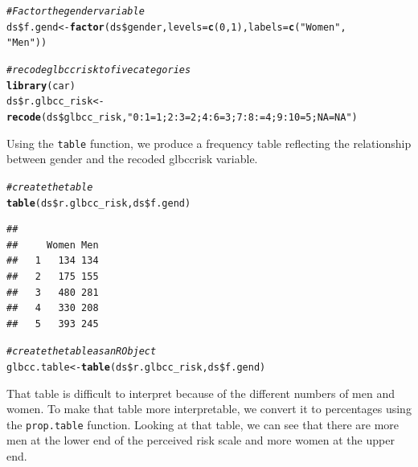 \documentclass[11pt,openany]{book}\usepackage[]{graphicx}\usepackage[]{color}
\makeatletter
\newcommand{\hlnum}[1]{\textcolor[rgb]{0.686,0.059,0.569}{#1}}%
\newcommand{\hlstr}[1]{\textcolor[rgb]{0.192,0.494,0.8}{#1}}%
\newcommand{\hlcom}[1]{\textcolor[rgb]{0.678,0.584,0.686}{\textit{#1}}}%
\newcommand{\hlopt}[1]{\textcolor[rgb]{0,0,0}{#1}}%
\newcommand{\hlstd}[1]{\textcolor[rgb]{0.345,0.345,0.345}{#1}}%
\newcommand{\hlkwb}[1]{\textcolor[rgb]{0.69,0.353,0.396}{#1}}%
\newcommand{\hlkwc}[1]{\textcolor[rgb]{0.333,0.667,0.333}{#1}}%
\newcommand{\hlkwd}[1]{\textcolor[rgb]{0.737,0.353,0.396}{\textbf{#1}}}%
\newenvironment{kframe}{%
 \def\at@end@of@kframe{}%
 \ifinner\ifhmode%
  \def\at@end@of@kframe{\end{minipage}}%
  \begin{minipage}{\columnwidth}%
 \fi\fi%
 \def\FrameCommand##1{\hskip\@totalleftmargin \hskip-\fboxsep
 \colorbox{shadecolor}{##1}\hskip-\fboxsep
     \hskip-\linewidth \hskip-\@totalleftmargin \hskip\columnwidth}%
 \MakeFramed {\advance\hsize-\width
   \@totalleftmargin\z@ \linewidth\hsize
   \@setminipage}}%
 {\par\unskip\endMakeFramed%
 \at@end@of@kframe}
\newenvironment{knitrout}{}{} %
\renewenvironment{knitrout}{\begin{singlespace}}{\end{singlespace}}
\makeatother
\begin{document}

\begin{knitrout}
\color{fgcolor}\begin{kframe}
\begin{alltt}
\hlcom{# Factor the gender variable}
\hlstd{ds}\hlopt{\$}\hlstd{f.gend} \hlkwb{<-} \hlkwd{factor}\hlstd{(ds}\hlopt{\$}\hlstd{gender,} \hlkwc{levels} \hlstd{=} \hlkwd{c}\hlstd{(}\hlnum{0}\hlstd{,} \hlnum{1}\hlstd{),} \hlkwc{labels} \hlstd{=} \hlkwd{c}\hlstd{(}\hlstr{"Women"}\hlstd{,}
    \hlstr{"Men"}\hlstd{))}

\hlcom{# recode glbccrisk to five categories}
\hlkwd{library}\hlstd{(car)}
\hlstd{ds}\hlopt{\$}\hlstd{r.glbcc_risk} \hlkwb{<-} \hlkwd{recode}\hlstd{(ds}\hlopt{\$}\hlstd{glbcc_risk,} \hlstr{"0:1=1; 2:3=2; 4:6=3; 7:8:=4; 9:10=5; NA=NA"}\hlstd{)}
\end{alltt}
\end{kframe}
\end{knitrout}

Using the \texttt{table} function, we produce a frequency table reflecting the relationship between gender and the recoded glbccrisk variable.  

\begin{knitrout}
\color{fgcolor}\begin{kframe}
\begin{alltt}
\hlcom{# create the table}
\hlkwd{table}\hlstd{(ds}\hlopt{\$}\hlstd{r.glbcc_risk, ds}\hlopt{\$}\hlstd{f.gend)}
\end{alltt}
\begin{verbatim}
##    
##     Women Men
##   1   134 134
##   2   175 155
##   3   480 281
##   4   330 208
##   5   393 245
\end{verbatim}
\begin{alltt}
\hlcom{# create the table as an R Object}
\hlstd{glbcc.table} \hlkwb{<-} \hlkwd{table}\hlstd{(ds}\hlopt{\$}\hlstd{r.glbcc_risk, ds}\hlopt{\$}\hlstd{f.gend)}
\end{alltt}
\end{kframe}
\end{knitrout}

That table is difficult to interpret because of the different numbers of men and women.  To make that table more interpretable, we convert it to percentages using the \texttt{prop.table} function.   Looking at that table, we can see that there are more men at the lower end of the perceived risk scale and more women at the upper end.
\end{document}
